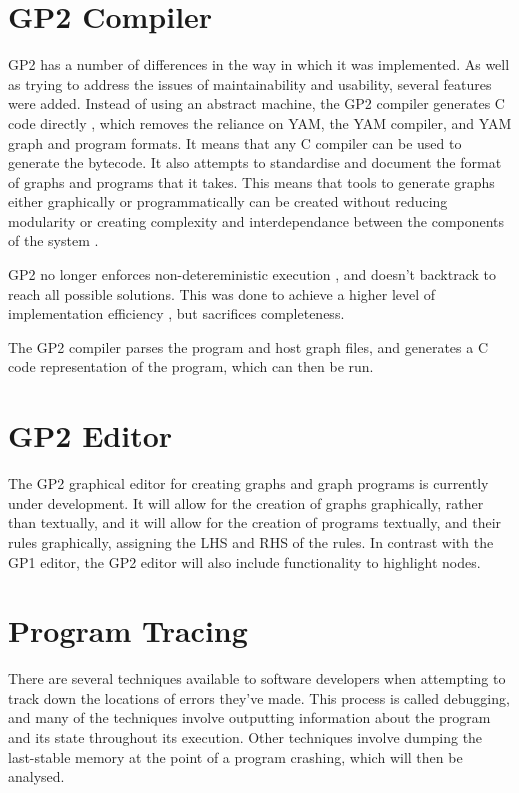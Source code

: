 \documentclass{UoYCSproject}
\begin{document}
\section{GP2 Compiler}
GP2 has a number of differences in the way in which it was implemented. As well as trying to address the issues of maintainability and usability, several features were added. %
Instead of using an abstract machine, the GP2 compiler generates C code directly \cite{chris_compiler}, which removes the reliance on YAM, the YAM compiler, and YAM graph and program formats. It means that any C compiler can be used to generate the bytecode. It also attempts to standardise and document the format of graphs and programs that it takes. This means that tools to generate graphs either graphically or programmatically can be created without reducing modularity or creating complexity and interdependance between the components of the system \cite{gp2_ide}.

GP2 no longer enforces non-detereministic execution \cite[p. 15]{gp2_ide}, and doesn't backtrack to reach all possible solutions. This was done to achieve a higher level of implementation efficiency \cite[p. 15]{chris_compiler}, but sacrifices completeness.

The GP2 compiler parses the program and host graph files, and generates a C code representation of the program, which can then be run. %


\section{GP2 Editor}
The GP2 graphical editor for creating graphs and graph programs is currently under development. It will allow for the creation of graphs graphically, rather than textually, and it will allow for the creation of programs textually, and their rules graphically, assigning the LHS and RHS of the rules. In contrast with the GP1 editor, the GP2 editor will also include functionality to highlight nodes. %

\section{Program Tracing}
There are several techniques available to software developers when attempting to track down the locations of errors they've made. This process is called debugging, and many of the techniques involve outputting information about the program and its state throughout its execution. Other techniques involve dumping the last-stable memory at the point of a program crashing, which will then be analysed. 
\end{document}
